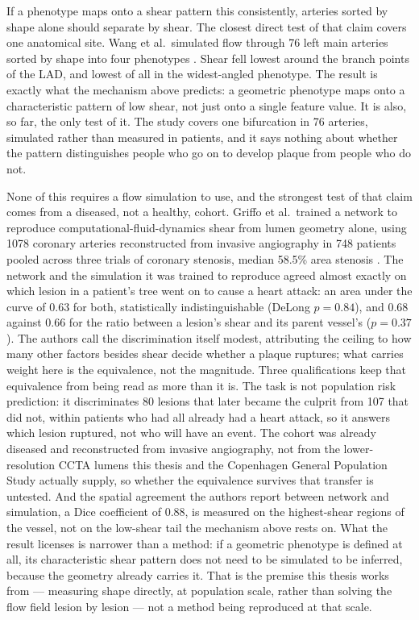 If a phenotype maps onto a shear pattern this consistently, arteries sorted by shape alone should
separate by shear.
The closest direct test of that claim covers one anatomical site.
Wang et al.\ simulated flow through 76 left main arteries sorted by shape into four phenotypes
\cite{wang2024lmphenotypes}.
Shear fell lowest around the branch points of the LAD, and lowest of all in the widest-angled
phenotype.
The result is exactly what the mechanism above predicts: a geometric phenotype maps onto a
characteristic pattern of low shear, not just onto a single feature value.
It is also, so far, the only test of it.
The study covers one bifurcation in 76 arteries, simulated rather than measured in patients, and it
says nothing about whether the pattern distinguishes people who go on to develop plaque from people
who do not.

None of this requires a flow simulation to use, and the strongest test of that claim comes from a
diseased, not a healthy, cohort.
Griffo et al.\ trained a network to reproduce computational-fluid-dynamics shear from lumen geometry
alone, using 1078 coronary arteries reconstructed from invasive angiography in 748 patients pooled
across three trials of coronary stenosis, median 58.5\% area stenosis \cite{griffo2026wss}.
The network and the simulation it was trained to reproduce agreed almost exactly on which lesion in a
patient's tree went on to cause a heart attack: an area under the curve of 0.63 for both,
statistically indistinguishable (DeLong $p=0.84$), and 0.68 against 0.66 for the ratio between a
lesion's shear and its parent vessel's ($p=0.37$).
The authors call the discrimination itself modest, attributing the ceiling to how many other factors
besides shear decide whether a plaque ruptures; what carries weight here is the equivalence, not the
magnitude.
Three qualifications keep that equivalence from being read as more than it is.
The task is not population risk prediction: it discriminates 80 lesions that later became the
culprit from 107 that did not, within patients who had all already had a heart attack, so it answers
which lesion ruptured, not who will have an event.
The cohort was already diseased and reconstructed from invasive angiography, not from the
lower-resolution CCTA lumens this thesis and the Copenhagen General Population Study actually
supply, so whether the equivalence survives that transfer is untested.
And the spatial agreement the authors report between network and simulation, a Dice coefficient of
0.88, is measured on the highest-shear regions of the vessel, not on the low-shear tail the
mechanism above rests on.
What the result licenses is narrower than a method: if a geometric phenotype is defined at all, its
characteristic shear pattern does not need to be simulated to be inferred, because the geometry
already carries it.
That is the premise this thesis works from --- measuring shape directly, at population scale, rather
than solving the flow field lesion by lesion --- not a method being reproduced at that scale.
